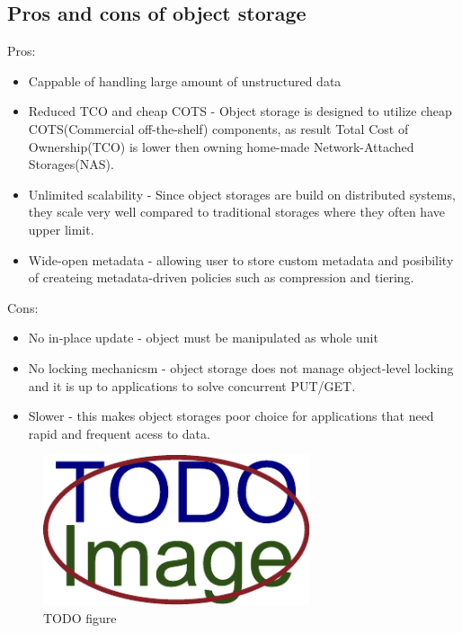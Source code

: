     \subsection{Pros and cons of object storage}
    Pros:
    \begin{itemize}
        \item{Cappable of handling large amount of unstructured data}
        \item{Reduced TCO and cheap COTS - Object storage is designed to utilize cheap COTS(Commercial off-the-shelf) components, as result Total Cost of Ownership(TCO) is lower then owning home-made Network-Attached Storages(NAS)\cite{networkStorage}.}
        \item{Unlimited scalability - Since object storages are build on distributed systems, they scale very well compared to traditional storages where they often have upper limit.\cite{openstackObjectStorage}}
        \item{Wide-open metadata - allowing user to store custom metadata and posibility of createing metadata-driven policies such as compression and tiering.}
    \end{itemize}
    Cons:
    \begin{itemize}
        \item{No in-place update - object must be manipulated as whole unit}
        \item{No locking mechanicsm - object storage does not manage object-level locking and it is up to applications to solve concurrent PUT/GET.}
        \item{Slower - this makes object storages poor choice for applications that need rapid and frequent acess to data.}
    \end{itemize}


    \begin{figure}[hbt]
        \centering
        \includegraphics[width=0.7\textwidth]{obrazky-figures/placeholder.pdf}
        \caption{TODO figure}
    \end{figure}

